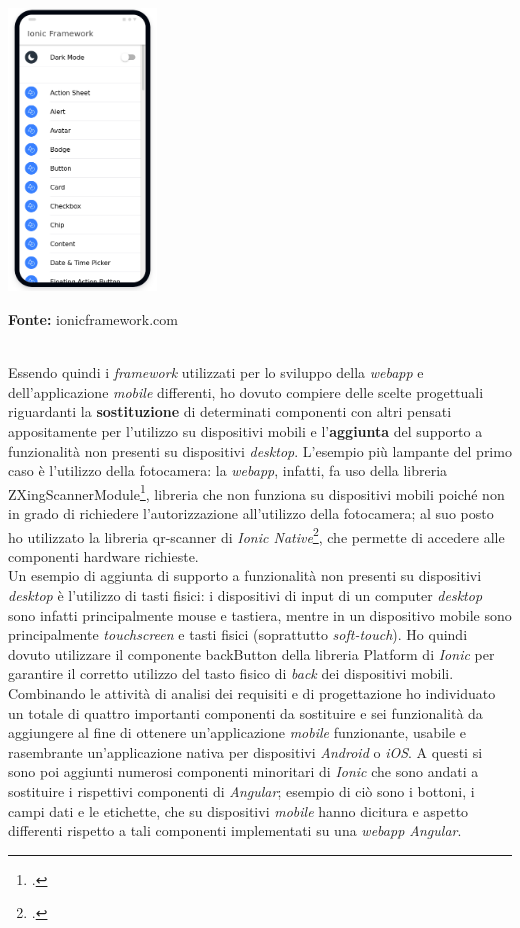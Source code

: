 \begin{minipage}{\linewidth}
  \centering
    \includegraphics[height=7.5cm]{immagini/ioniclib}
  \caption*{\textbf{Fonte:} ionicframework.com}
\end{minipage} \\

Essendo quindi i \textit{framework} utilizzati per lo sviluppo della \textit{webapp} e dell'applicazione \textit{mobile} differenti, ho dovuto compiere delle scelte progettuali riguardanti la \textbf{sostituzione} di determinati componenti con altri pensati appositamente per l'utilizzo su dispositivi mobili e l'\textbf{aggiunta} del supporto a funzionalità non presenti su dispositivi \textit{desktop}. L'esempio più lampante del primo caso è l'utilizzo della fotocamera: la \textit{webapp}, infatti, fa uso della libreria ZXingScannerModule\footcite{tec:zxingscannermodule}, libreria che non funziona su dispositivi mobili poiché non in grado di richiedere l'autorizzazione all'utilizzo della fotocamera; al suo posto ho utilizzato la libreria qr-scanner di \textit{Ionic Native}\footcite{tec:ionicnative}, che permette di accedere alle componenti hardware richieste. \\
Un esempio di aggiunta di supporto a funzionalità non presenti su dispositivi \textit{desktop} è l'utilizzo di tasti fisici: i dispositivi di input di un computer \textit{desktop} sono infatti principalmente mouse e tastiera, mentre in un dispositivo mobile sono principalmente \textit{touchscreen} e tasti fisici (soprattutto \textit{soft-touch}). Ho quindi dovuto utilizzare il componente backButton della libreria Platform di \textit{Ionic} per garantire il corretto utilizzo del tasto fisico di \textit{back} dei dispositivi mobili. \\
Combinando le attività di analisi dei requisiti e di progettazione ho individuato un totale di quattro importanti componenti da sostituire e sei funzionalità da aggiungere al fine di ottenere un'applicazione \textit{mobile} funzionante, usabile e rasembrante un'applicazione nativa per dispositivi \textit{Android} o \textit{iOS}. A questi si sono poi aggiunti numerosi componenti minoritari di \textit{Ionic} che sono andati a sostituire i rispettivi componenti di \textit{Angular}; esempio di ciò sono i bottoni, i campi dati e le etichette, che su dispositivi \textit{mobile} hanno dicitura e aspetto differenti rispetto a tali componenti implementati su una \textit{webapp Angular}.

